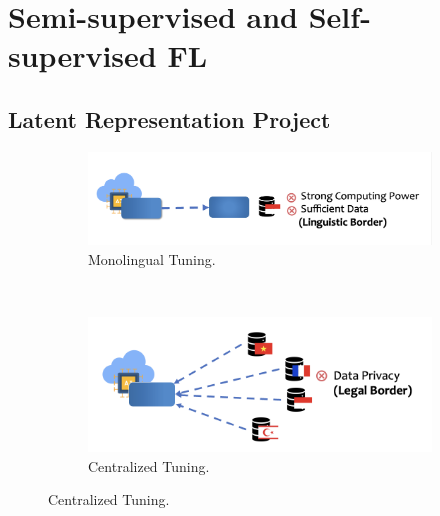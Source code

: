 \documentclass[withindex,glossary]{cam-thesis}
\begin{document}



\section{Semi-supervised and Self-supervised FL}
\subsection{Latent Representation Project}

\begin{figure}
    \centering
    \vspace{-1cm}%
    \begin{minipage}{0.49\linewidth}
        \begin{subfigure}[b]{\linewidth}
            \includegraphics[width=\linewidth]{1.jpg}
            \caption{Monolingual Tuning.}
            \label{fig:a}
        \end{subfigure}
        \\
        \begin{subfigure}[b]{\linewidth}
            \includegraphics[width=\linewidth]{2.jpg}
            \caption{Centralized Tuning.}
            \label{fig:b}
        \end{subfigure}
    \end{minipage}

\end{figure}
\end{document}
